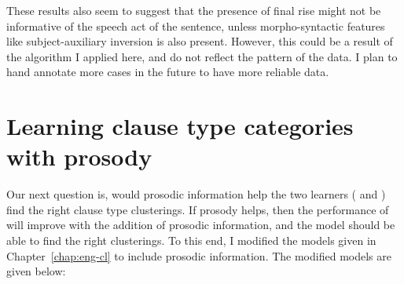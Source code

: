 These results also seem to suggest that the presence of final rise might not be informative of the speech act of the sentence, unless morpho-syntactic features like subject-auxiliary inversion is also present. However, this could be a result of the algorithm I applied here, and do not reflect the pattern of the data. I plan to hand annotate more cases in the future to have more reliable data.

\section{Learning clause type categories with prosody}\label{sec:prosody:model}

Our next question is, would prosodic information help the two learners (\distlearner{} and \praglearner{}) find the right clause type clusterings. If prosody helps, then the performance of \dlearnerabbr{} will improve with the addition of prosodic information, and the model should be able to find the right clusterings. To this end, I modified the models given in Chapter~\ref{chap:eng-cl} to include prosodic information. The modified models are given below:



